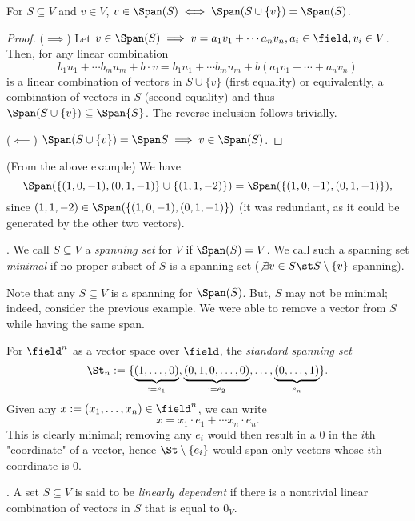 \begin{lemma}
    For $S \subseteq V$ and $v \in V$, $v \in \Span (S) \iff \Span (S \cup \{v\}) = \Span (S)$.
\end{lemma}
\begin{proof}
    ($\implies$) Let $v \in \Span (S) \implies v = a_1 v_1 + \cdots a_n v_n, a_i \in \field, v_i \in V$. Then, for any linear combination \[
    b_1 u_1 + \cdots b_m u_m + b \cdot v  = b_1 u_1 + \cdots b_m u_m + b(a_1 v_1 + \cdots + a_n v_n)   
    \]
    is a linear combination of vectors in $S \cup \{v\}$ (first equality) or equivalently, a combination of vectors in $S$ (second equality) and thus $\Span (S \cup \{v\}) \subseteq \Span{S}$. The reverse inclusion follows trivially.

    ($\impliedby$) $\Span (S \cup \{v\}) = \Span S \implies v \in \Span (S)$.
\end{proof}

\begin{example}
    (From the above example) We have \[
    \Span (\{(1, 0, -1), (0, 1, -1)\} \cup \{(1, 1, -2)\}) = \Span( \{(1, 0, -1), (0, 1, -1) \}),
    \]
    since $(1, 1, -2) \in \Span(\{(1, 0, -1), (0, 1, -1) \})$ (it was redundant, as it could be generated by the other two vectors).
\end{example}

\begin{definition}
     . We call $S \subseteq V$ a \emph{spanning set} for $V$ if $\Span (S) = V$. We call such a spanning set \emph{minimal} if no proper subset of $S$ is a spanning set ($\not \exists v \in S \st S \setminus \{v\}$ spanning).
\end{definition}

\begin{remark}
    Note that any $S \subseteq V$ is a spanning for $\Span (S)$. But, $S$ may not be minimal; indeed, consider the previous example. We were able to remove a vector from $S$ while having the same span.
\end{remark}

\begin{example}
    For $\field^n$ as a vector space over $\field$, the \emph{standard spanning set} $$\St_n := \{\underbrace{(1, \dots, 0)}_{:=e_1}, \underbrace{(0, 1, 0, \dots, 0)}_{:=e_2}, \dots, \underbrace{(0, \dots, 1)}_{e_n}\}.$$
    Given any $x := (x_1, \dots, x_n) \in \field^n$, we can write \[
        x = x_1 \cdot e_1 + \cdots x_n \cdot e_n.
    \]
    This is clearly minimal; removing any $e_i$ would then result in a $0$ in the $i$th "coordinate" of a vector, hence $\St \setminus\{e_i\}$ would span only vectors whose $i$th coordinate is $0$.
\end{example}

\begin{definition}
     . A set $S \subseteq V$ is said to be \emph{linearly dependent} if there is a nontrivial linear combination of vectors in $S$ that is equal to $0_V$.
\end{definition}
